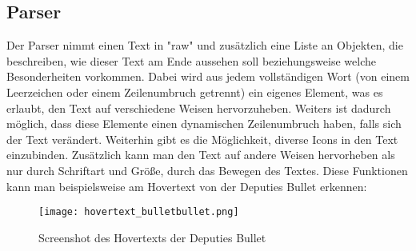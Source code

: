 
\renewcommand{\kapitelautor}{Autor: Felix Zwickelstorfer}
\subsection{Parser}\label{subsec:parser}
\renewcommand{\kapitelautor}{Autor: Felix Zwickelstorfer}

Der Parser nimmt einen Text in "raw" und zusätzlich eine Liste an Objekten, die beschreiben, wie dieser Text am Ende aussehen soll beziehungsweise welche Besonderheiten vorkommen.
Dabei wird aus jedem vollständigen Wort (von einem Leerzeichen oder einem Zeilenumbruch getrennt) ein eigenes Element, was es erlaubt, den Text auf verschiedene Weisen hervorzuheben.
Weiters ist dadurch möglich, dass diese Elemente einen dynamischen Zeilenumbruch haben, falls sich der Text verändert.
Weiterhin gibt es die Möglichkeit, diverse Icons in den Text einzubinden.
Zusätzlich kann man den Text auf andere Weisen hervorheben als nur durch Schriftart und Größe, \zB durch das Bewegen des Textes.
Diese Funktionen kann man beispielsweise am Hovertext von der Deputies Bullet erkennen:
\begin{figure}[H]
    \centering
    \texttt{[image: hovertext\_bulletbullet.png]}
    \caption{Screenshot des Hovertexts der Deputies Bullet}
\end{figure}